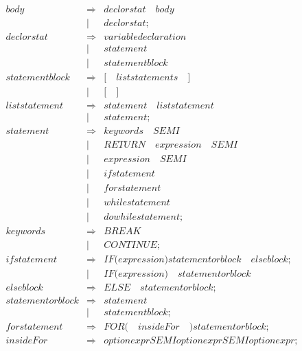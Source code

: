 \documentclass{article}
\begin{document}
\begin{eqnarray}
   \mathit{body} & \Rightarrow & \mathit{declorstat} \quad \mathit{body} \\
   & | & \mathit{declorstat} ; \\
   \mathit{declorstat} & \Rightarrow & \mathit{variabledeclaration} \\
   & | & \mathit{statement}\\
   & | & \mathit{statementblock} \\
   \mathit{statementblock} & \Rightarrow & \mathit{[} \quad \mathit{liststatements} \quad \mathit{]}\\
   & | & \mathit{[} \quad \mathit{]}\\
   \mathit{liststatement} & \Rightarrow & \mathit{statement} \quad \mathit{liststatement} \\
   & | & \mathit{statement} ; \\
   \mathit{statement} & \Rightarrow & \mathit{keywords} \quad \mathit{SEMI}\\
   & | & \mathit{RETURN} \quad \mathit{expression} \quad \mathit{SEMI}\\
   & | & \mathit{expression} \quad \mathit{SEMI} \\
   & | & \mathit{ifstatement} \\
   & | & \mathit{forstatement} \\
   & | & \mathit{whilestatement} \\
   & | & \mathit{dowhilestatement} ;\\
   \mathit{keywords} & \Rightarrow & \mathit{BREAK} \\
   & | & \mathit{CONTINUE};\\
   \mathit{ifstatement} & \Rightarrow & \mathit{IF} \mathit{(} \mathit{expression} \mathit{)} \mathit{statementorblock} \quad \mathit{elseblock} ;\\
   & | & \mathit{IF} \mathit{(} \mathit{expression} \mathit{)} \quad \mathit{statementorblock} \\
   \mathit{elseblock} & \Rightarrow & \mathit{ELSE} \quad \mathit{statementorblock} ; \\
   \mathit{statementorblock} & \Rightarrow & \mathit{statement} \\
   &| & \mathit{statementblock};\\
   \mathit{forstatement} & \Rightarrow & \mathit{FOR} \mathit{(} \quad \mathit{insideFor}\quad\mathit{)} \mathit{statementorblock};\\
   \mathit{insideFor} & \Rightarrow&\mathit{optionexpr}\mathit{SEMI}\mathit{optionexpr}\mathit{SEMI}\mathit{optionexpr};\\

\end{eqnarray}
\end{document}
